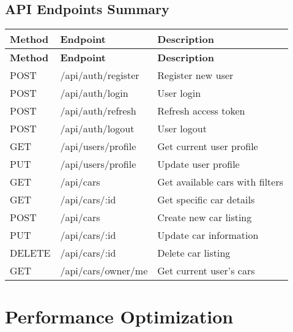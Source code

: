 \documentclass[12pt,a4paper]{article}
\begin{document}
\subsection{API Endpoints Summary}
\begin{longtable}{|p{2cm}|p{4cm}|p{8cm}|}
\hline
\textbf{Method} & \textbf{Endpoint} & \textbf{Description} \\
\hline
\endfirsthead
\hline
\textbf{Method} & \textbf{Endpoint} & \textbf{Description} \\
\hline
\endhead

POST & /api/auth/register & Register new user \\
\hline
POST & /api/auth/login & User login \\
\hline
POST & /api/auth/refresh & Refresh access token \\
\hline
POST & /api/auth/logout & User logout \\
\hline
GET & /api/users/profile & Get current user profile \\
\hline
PUT & /api/users/profile & Update user profile \\
\hline
GET & /api/cars & Get available cars with filters \\
\hline
GET & /api/cars/:id & Get specific car details \\
\hline
POST & /api/cars & Create new car listing \\
\hline
PUT & /api/cars/:id & Update car information \\
\hline
DELETE & /api/cars/:id & Delete car listing \\
\hline
GET & /api/cars/owner/me & Get current user's cars \\
\hline
\end{longtable}

\section{Performance Optimization}
\end{document}
